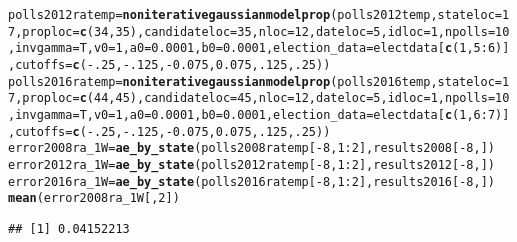 \documentclass{article}\usepackage[]{graphicx}\usepackage[]{color}
\makeatletter
\newcommand{\hlnum}[1]{\textcolor[rgb]{0.686,0.059,0.569}{#1}}%
\newcommand{\hlopt}[1]{\textcolor[rgb]{0,0,0}{#1}}%
\newcommand{\hlstd}[1]{\textcolor[rgb]{0.345,0.345,0.345}{#1}}%
\newcommand{\hlkwb}[1]{\textcolor[rgb]{0.69,0.353,0.396}{#1}}%
\newcommand{\hlkwc}[1]{\textcolor[rgb]{0.333,0.667,0.333}{#1}}%
\newcommand{\hlkwd}[1]{\textcolor[rgb]{0.737,0.353,0.396}{\textbf{#1}}}%
\newenvironment{kframe}{%
 \def\at@end@of@kframe{}%
 \ifinner\ifhmode%
  \def\at@end@of@kframe{\end{minipage}}%
  \begin{minipage}{\columnwidth}%
 \fi\fi%
 \def\FrameCommand##1{\hskip\@totalleftmargin \hskip-\fboxsep
 \colorbox{shadecolor}{##1}\hskip-\fboxsep
     \hskip-\linewidth \hskip-\@totalleftmargin \hskip\columnwidth}%
 \MakeFramed {\advance\hsize-\width
   \@totalleftmargin\z@ \linewidth\hsize
   \@setminipage}}%
 {\par\unskip\endMakeFramed%
 \at@end@of@kframe}
\newenvironment{knitrout}{}{} %
\makeatother
\begin{document}
\begin{knitrout}
\begin{kframe}
\begin{alltt}
\hlstd{polls2012ratemp} \hlkwb{=} \hlkwd{noniterativegaussianmodelprop}\hlstd{(polls2012temp,} \hlkwc{stateloc} \hlstd{=} \hlnum{17}\hlstd{,} \hlkwc{proploc} \hlstd{=} \hlkwd{c}\hlstd{(}\hlnum{34}\hlstd{,} \hlnum{35}\hlstd{),} \hlkwc{candidateloc} \hlstd{=} \hlnum{35}\hlstd{,}  \hlkwc{nloc} \hlstd{=} \hlnum{12}\hlstd{,} \hlkwc{dateloc} \hlstd{=} \hlnum{5}\hlstd{,} \hlkwc{idloc} \hlstd{=} \hlnum{1}\hlstd{,}  \hlkwc{npolls} \hlstd{=} \hlnum{10}\hlstd{,}\hlkwc{invgamma} \hlstd{= T,} \hlkwc{v0}\hlstd{=}\hlnum{1}\hlstd{,} \hlkwc{a0}\hlstd{=}\hlnum{0.0001}\hlstd{,} \hlkwc{b0}\hlstd{=}\hlnum{0.0001}\hlstd{,}  \hlkwc{election_data} \hlstd{= electdata[}\hlkwd{c}\hlstd{(}\hlnum{1}\hlstd{,} \hlnum{5}\hlopt{:}\hlnum{6}\hlstd{)],} \hlkwc{cutoffs} \hlstd{=} \hlkwd{c}\hlstd{(}\hlopt{-}\hlnum{.25}\hlstd{,} \hlopt{-}\hlnum{.125}\hlstd{,} \hlopt{-}\hlnum{0.075}\hlstd{,} \hlnum{0.075}\hlstd{,} \hlnum{.125}\hlstd{,} \hlnum{.25}\hlstd{))}
\hlstd{polls2016ratemp} \hlkwb{=} \hlkwd{noniterativegaussianmodelprop}\hlstd{(polls2016temp,} \hlkwc{stateloc} \hlstd{=} \hlnum{17}\hlstd{,} \hlkwc{proploc} \hlstd{=} \hlkwd{c}\hlstd{(}\hlnum{44}\hlstd{,} \hlnum{45}\hlstd{),} \hlkwc{candidateloc} \hlstd{=} \hlnum{45}\hlstd{,} \hlkwc{nloc} \hlstd{=} \hlnum{12}\hlstd{,} \hlkwc{dateloc} \hlstd{=} \hlnum{5}\hlstd{,} \hlkwc{idloc} \hlstd{=} \hlnum{1}\hlstd{,}\hlkwc{npolls} \hlstd{=} \hlnum{10}\hlstd{,} \hlkwc{invgamma} \hlstd{= T,} \hlkwc{v0}\hlstd{=}\hlnum{1}\hlstd{,} \hlkwc{a0}\hlstd{=}\hlnum{0.0001}\hlstd{,} \hlkwc{b0}\hlstd{=}\hlnum{0.0001}\hlstd{,} \hlkwc{election_data} \hlstd{= electdata[}\hlkwd{c}\hlstd{(}\hlnum{1}\hlstd{,} \hlnum{6}\hlopt{:}\hlnum{7}\hlstd{)],} \hlkwc{cutoffs} \hlstd{=} \hlkwd{c}\hlstd{(}\hlopt{-}\hlnum{.25}\hlstd{,} \hlopt{-}\hlnum{.125}\hlstd{,} \hlopt{-}\hlnum{0.075}\hlstd{,} \hlnum{0.075}\hlstd{,} \hlnum{.125}\hlstd{,} \hlnum{.25}\hlstd{))}
\hlstd{error2008ra_1W} \hlkwb{=} \hlkwd{ae_by_state}\hlstd{(polls2008ratemp[}\hlopt{-}\hlnum{8}\hlstd{,} \hlnum{1}\hlopt{:}\hlnum{2}\hlstd{], results2008[}\hlopt{-}\hlnum{8}\hlstd{, ])}
\hlstd{error2012ra_1W} \hlkwb{=} \hlkwd{ae_by_state}\hlstd{(polls2012ratemp[}\hlopt{-}\hlnum{8}\hlstd{,} \hlnum{1}\hlopt{:}\hlnum{2}\hlstd{], results2012[}\hlopt{-}\hlnum{8}\hlstd{, ])}
\hlstd{error2016ra_1W} \hlkwb{=} \hlkwd{ae_by_state}\hlstd{(polls2016ratemp[}\hlopt{-}\hlnum{8}\hlstd{,} \hlnum{1}\hlopt{:}\hlnum{2}\hlstd{], results2016[}\hlopt{-}\hlnum{8}\hlstd{, ])}
\hlkwd{mean}\hlstd{(error2008ra_1W[,}\hlnum{2}\hlstd{])}
\end{alltt}
\begin{verbatim}
## [1] 0.04152213

\end{verbatim}
\end{kframe}
\end{knitrout}
\end{document}
